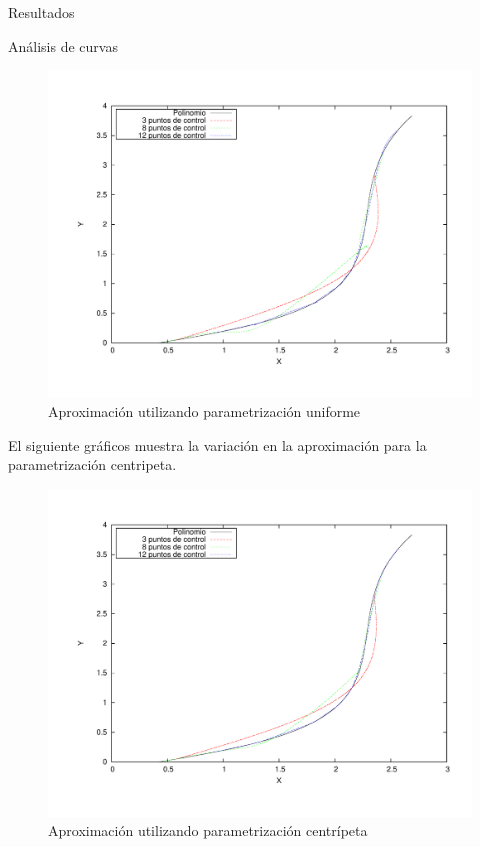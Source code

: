 \begin{section}{Resultados}
\begin{subsection}{Análisis de curvas}
		\begin{figure}[H]
		  \centering
			\includegraphics[width=14cm]{graficos/uniform_grafiquinSame.pdf}
		  \caption{Aproximación utilizando parametrización uniforme}
		  \label{fig:uniform}
		\end{figure}
		
		\VSP
		
		El siguiente gráficos muestra la variación en la aproximación para la parametrización centripeta.
		
		\begin{figure}[H]
		  \centering
			\includegraphics[width=14cm]{graficos/centripetal_grafiquinSame.pdf}
		  \caption{Aproximación utilizando parametrización centrípeta}
		  \label{fig:centripetal}
		\end{figure}
		

\end{subsection}
\end{section}

